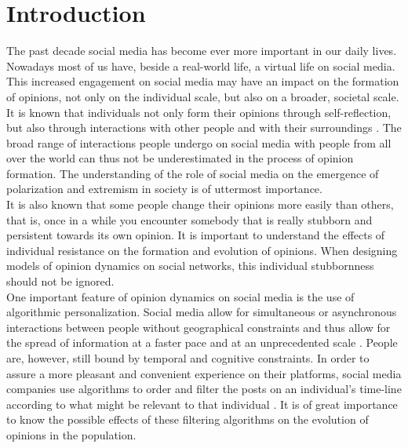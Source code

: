 \documentclass[11 pt , letterpaper , twoside , openright]{book}
\begin{document}
\mainmatter



\pagestyle{fancy}
\fancyhf{}
\lhead{\textcolor{NavyBlue}{\chaptername} \ \textcolor{NavyBlue}{\thechapter}}
\rhead{\rightmark}
\cfoot{\thepage}

\chapter{Introduction}


The past decade social media has become ever more important in our daily lives. Nowadays most of us have, beside a real-world life, a virtual life on social media. This increased engagement on social media may have an impact on the formation of opinions, not only on the individual scale, but also on a broader, societal scale. \\
\newline
It is known that individuals not only form their opinions through self-reflection, but also through interactions with other people and with their surroundings \cite{Perra2019}. The broad range of interactions people undergo on social media with people from all over the world can thus not be underestimated in the process of opinion formation. The understanding of the role of social media on the emergence of polarization and extremism in society is of uttermost importance.\\
\newline
It is also known that some people change their opinions more easily than others, that is, once in a while you encounter somebody that is really stubborn and persistent towards its own opinion. It is important to understand the effects of individual resistance on the formation and evolution of opinions. When designing models of opinion dynamics on social networks, this individual stubbornness should not be ignored.\\
\newline
One important feature of opinion dynamics on social media is the use of algorithmic personalization. Social media allow for simultaneous or asynchronous interactions between people without geographical constraints and thus allow for the spread of information at a faster pace and at an unprecedented scale \cite{Perra2019}. People are, however, still bound by temporal and cognitive constraints. In order to assure a more pleasant and convenient experience on their platforms, social media companies use algorithms to order and filter the posts on an individual's time-line according to what might be relevant to that individual \cite{Perra2019}. It is of great importance to know the possible effects of these filtering algorithms on the evolution of opinions in the population.\\  
\end{document}
